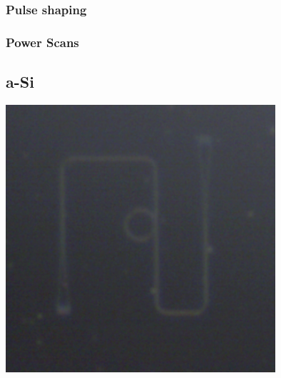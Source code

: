 \subsubsection{Pulse shaping}
\subsubsection{Power Scans}
%
\subsection{a-Si}
\begingroup
    \centering  
    \includegraphics[width=10cm]{img/results/chipPictures/exampleASIRing.png}
     \vspace{3pt} \label{crossCompare}
\endgroup
